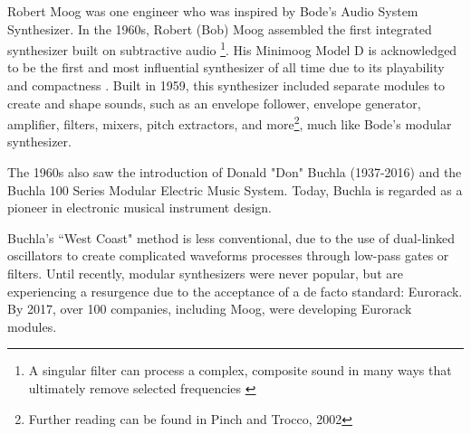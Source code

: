 Robert Moog was one engineer who was inspired by Bode's Audio System Synthesizer. In the 1960s, Robert (Bob) Moog assembled the first integrated synthesizer built on subtractive audio \cite{Gabrielli_2020}\footnote{A singular filter can process a complex, composite sound in many ways that ultimately remove selected frequencies \cite{Winer_2018}}. His Minimoog Model D is acknowledged to be the first and most influential synthesizer of all time due to its playability and compactness \cite{Gabrielli_2020}. Built in 1959, this synthesizer included separate modules to create and shape sounds, such as an envelope follower, envelope generator, amplifier, filters, mixers, pitch extractors, and more\footnote{Further reading can be found in Pinch and Trocco, 2002}, much like Bode's modular synthesizer.

The 1960s also saw the introduction of Donald "Don" Buchla (1937-2016) and the Buchla 100 Series Modular Electric Music System. Today, Buchla is regarded as a pioneer in electronic musical instrument design.

Buchla's ``West Coast" method is less conventional, due to the use of dual-linked oscillators to create complicated waveforms processes through low-pass gates or filters. Until recently, modular synthesizers were never popular, but are experiencing a resurgence due to the acceptance of a de facto standard: Eurorack. By 2017, over 100 companies, including Moog, were developing Eurorack modules.